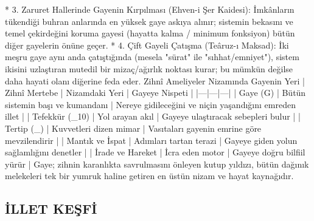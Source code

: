 \documentclass[11pt,a4paper]{article}
\begin{document}
 * 3. Zaruret Hallerinde Gayenin Kırpılması (Ehven-i Şer Kaidesi):
   İmkânların tükendiği buhran anlarında en yüksek gaye askıya alınır; sistemin bekasını ve temel çekirdeğini koruma gayesi (hayatta kalma / minimum fonksiyon) bütün diğer gayelerin önüne geçer.
 * 4. Çift Gayeli Çatışma (Teâruz-ı Maksad):
   İki meşru gaye aynı anda çatıştığında (mesela "sürat" ile "sıhhat/emniyet"), sistem ikisini uzlaştıran mutedil bir mizaç/ağırlık noktası kurar; bu mümkün değilse daha hayati olanı diğerine feda eder.
Zihnî Ameliyeler Nizamında Gayenin Yeri
| Zihnî Mertebe | Nizamdaki Yeri | Gayeye Nispeti |
|---|---|---|
| Gaye (G) | Bütün sistemin başı ve kumandanı | Nereye gidileceğini ve niçin yaşandığını emreden illet |
| Tefekkür (_{10}) | Yol arayan akıl | Gayeye ulaştıracak sebepleri bulur |
| Tertip (_{}) | Kuvvetleri dizen mimar | Vasıtaları gayenin emrine göre mevzilendirir |
| Mantık ve İspat | Adımları tartan terazi | Gayeye giden yolun sağlamlığını denetler |
| İrade ve Hareket | İcra eden motor | Gayeye doğru bilfiil yürür |
Gaye; zihnin karanlıkta savrulmasını önleyen kutup yıldızı, bütün dağınık melekeleri tek bir yumruk haline getiren en üstün nizam ve hayat kaynağıdır.






\subsection{İLLET KEŞFİ}
\end{document}
